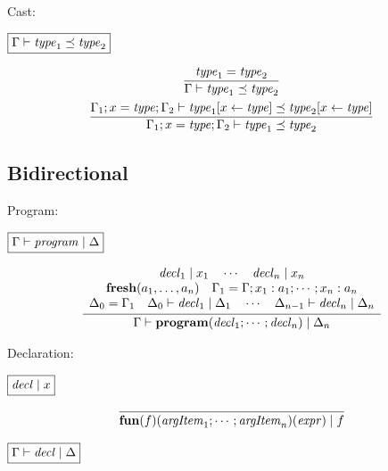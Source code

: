 Cast:

$\fbox{$\Gamma \vdash \mathit{type}_1 \preceq \mathit{type}_2$}$

\begin{gather*}
  \infer{\Gamma \vdash \mathit{type}_1 \preceq \mathit{type}_2}{
    \mathit{type}_1 = \mathit{type}_2
  }
  \\
  \infer{\Gamma_1; x = \mathit{type}; \Gamma_2 \vdash \mathit{type}_1 \preceq \mathit{type}_2}{
    \Gamma_1; x = \mathit{type}; \Gamma_2 \vdash \mathit{type}_1[x \assign \mathit{type}] \preceq \mathit{type}_2[x \assign \mathit{type}]
  }
\end{gather*}

\subsection{Bidirectional}

Program:

$\fbox{$\Gamma \vdash \mathit{program} \mid \Delta$}$

\begin{gather*}
  \infer{\Gamma \vdash \mathbf{program}(\mathit{decl}_1; \cdots; \mathit{decl}_n) \mid \Delta_n}{
    \begin{array}{c}
      \mathit{decl}_1 \mid x_1
      \hspace{1em}
      \cdots
      \hspace{1em}
      \mathit{decl}_n \mid x_n
      \\
      \mathbf{fresh}(a_1, \ldots, a_n)
      \hspace{1em}
      \Gamma_1 = \Gamma; x_1: a_1; \cdots; x_n: a_n
      \\
      \Delta_0 = \Gamma_1
      \hspace{1em}
      \Delta_0 \vdash \mathit{decl}_1 \mid \Delta_1
      \hspace{1em}
      \cdots
      \hspace{1em}
      \Delta_{n - 1} \vdash \mathit{decl}_n \mid \Delta_n
    \end{array}
  }
\end{gather*}

Declaration:

$\fbox{$\mathit{decl} \mid x$}$

\begin{gather*}
  \infer{\mathbf{fun}(f)(\mathit{argItem}_1; \cdots; \mathit{argItem}_n)(\mathit{expr}) \mid f}{}
\end{gather*}

$\fbox{$\Gamma \vdash \mathit{decl} \mid \Delta$}$

